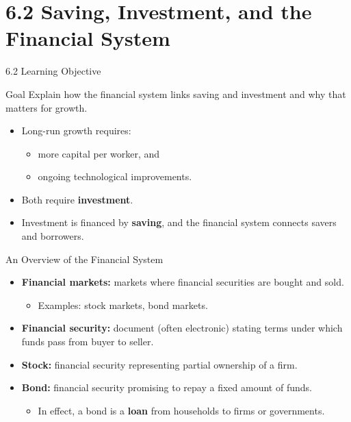 \documentclass[aspectratio=169]{beamer}
\begin{document}
\section{6.2 Saving, Investment, and the Financial System}

\begin{frame}{6.2 Learning Objective}
\transfade
\begin{block}{Goal}
Explain how the financial system links saving and investment and why that matters for growth.
\end{block}
\begin{itemize}
  \item Long-run growth requires:
  \begin{itemize}
    \item more capital per worker, and
    \item ongoing technological improvements.
  \end{itemize}
  \item Both require \textbf{investment}.
  \item Investment is financed by \textbf{saving}, and the financial system connects savers and borrowers.
\end{itemize}
\end{frame}


\begin{frame}{An Overview of the Financial System}
\transfade
\begin{itemize}
  \item \textbf{Financial markets:} markets where financial securities are bought and sold.
  \begin{itemize}
    \item Examples: stock markets, bond markets.
  \end{itemize}
  \item \textbf{Financial security:} document (often electronic) stating terms under which funds pass from buyer to seller.
  \item \textbf{Stock:} financial security representing partial ownership of a firm.
  \item \textbf{Bond:} financial security promising to repay a fixed amount of funds.
  \begin{itemize}
    \item In effect, a bond is a \textbf{loan} from households to firms or governments.
  \end{itemize}
\end{itemize}
\end{frame}
\end{document}
